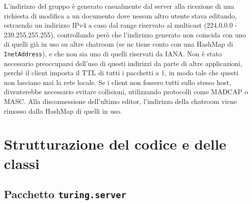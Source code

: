 \documentclass[a4paper,12pt]{article}
\begin{document}
 L'indirizzo del gruppo è generato casualmente dal server alla ricezione di una richiesta di modifica a un documento dove nessun altro utente stava editando, estraendo un indirizzo IPv4 a caso dal range riservato al multicast (224.0.0.0 - 239.255.255.255), controllando però che l'indirizzo generato non coincida con uno di quelli già in uso su altre chatroom (se ne tiene conto con una HashMap di \texttt{InetAddress}), e che non sia uno di quelli riservati da IANA. Non è stato necessario preoccuparsi dell'uso di questi indirizzi da parte di altre applicazioni, perché il client imposta il TTL di tutti i pacchetti a 1, in modo tale che questi non lasciano mai la rete locale. Se i client non fossero tutti sullo stesso host, diventerebbe necessario evitare collisioni, utilizzando protocolli come MADCAP o MASC. Alla disconnessione dell'ultimo editor, l'indirizzo della chatroom viene rimosso dalla HashMap di quelli in uso.
 
  \section{ Strutturazione del codice e delle classi }
 
 \subsection{ Pacchetto \texttt{turing.server} }
 
\end{document}
